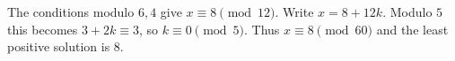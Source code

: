 The conditions modulo $6,4$ give $x\equiv8\pmod{12}$. Write $x=8+12k$. Modulo $5$ this becomes $3+2k\equiv3$, so $k\equiv0\pmod5$. Thus $x\equiv8\pmod{60}$ and the least positive solution is $\boxed8$.
